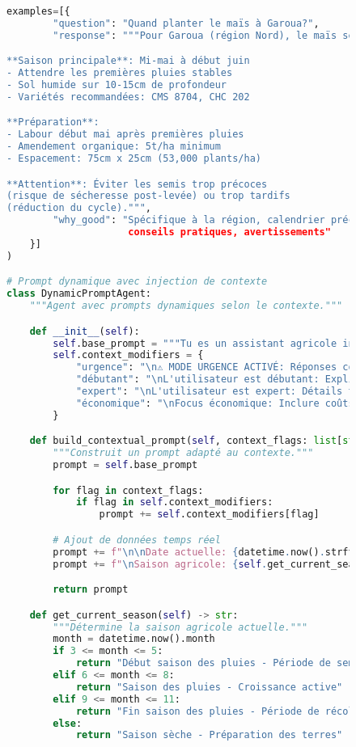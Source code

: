 \begin{figure}[H]
\begin{lstlisting}[language=Python, caption=Structure avancée des prompts]
    examples=[{
        "question": "Quand planter le maïs à Garoua?",
        "response": """Pour Garoua (région Nord), le maïs se plante:

**Saison principale**: Mi-mai à début juin
- Attendre les premières pluies stables
- Sol humide sur 10-15cm de profondeur
- Variétés recommandées: CMS 8704, CHC 202

**Préparation**:
- Labour début mai après premières pluies
- Amendement organique: 5t/ha minimum
- Espacement: 75cm x 25cm (53,000 plants/ha)

**Attention**: Éviter les semis trop précoces
(risque de sécheresse post-levée) ou trop tardifs
(réduction du cycle).""",
        "why_good": "Spécifique à la région, calendrier précis,
                     conseils pratiques, avertissements"
    }]
)

# Prompt dynamique avec injection de contexte
class DynamicPromptAgent:
    """Agent avec prompts dynamiques selon le contexte."""

    def __init__(self):
        self.base_prompt = """Tu es un assistant agricole intelligent."""
        self.context_modifiers = {
            "urgence": "\n⚠️ MODE URGENCE ACTIVÉ: Réponses courtes et actions immédiates.",
            "débutant": "\nL'utilisateur est débutant: Explications simples, éviter le jargon.",
            "expert": "\nL'utilisateur est expert: Détails techniques approfondis.",
            "économique": "\nFocus économique: Inclure coûts, ROI, analyses financières."
        }

    def build_contextual_prompt(self, context_flags: list[str]) -> str:
        """Construit un prompt adapté au contexte."""
        prompt = self.base_prompt

        for flag in context_flags:
            if flag in self.context_modifiers:
                prompt += self.context_modifiers[flag]

        # Ajout de données temps réel
        prompt += f"\n\nDate actuelle: {datetime.now().strftime('%d/%m/%Y')}"
        prompt += f"\nSaison agricole: {self.get_current_season()}"

        return prompt

    def get_current_season(self) -> str:
        """Détermine la saison agricole actuelle."""
        month = datetime.now().month
        if 3 <= month <= 5:
            return "Début saison des pluies - Période de semis principale"
        elif 6 <= month <= 8:
            return "Saison des pluies - Croissance active"
        elif 9 <= month <= 11:
            return "Fin saison des pluies - Période de récolte"
        else:
            return "Saison sèche - Préparation des terres"
\end{lstlisting}
\end{figure}

